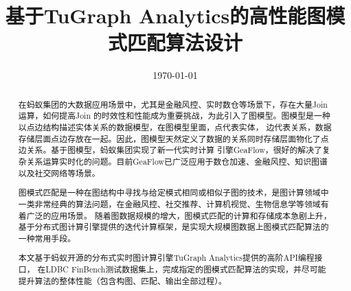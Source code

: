 

\title{基于TuGraph Analytics的⾼性能图模式匹配算法设计}
\date{\today}





\maketitle

\begin{abstract}
在蚂蚁集团的大数据应用场景中，尤其是金融风控、实时数仓等场景下，存在大量Join运算，如何提高Join
的时效性和性能成为重要挑战，为此引入了图模型。图模型是一种以点边结构描述实体关系的数据模型，在图模型里面，点代表实体，
边代表关系，数据存储层面点边存放在一起。因此，图模型天然定义了数据的关系同时存储层面物化了点边关系。基于图模型，蚂蚁集团实现了新一代实时计算 引擎GeaFlow，很好的解决了复杂关系运算实时化的问题。目前GeaFlow已广泛应用于数仓加速、金融风控、知识图谱以及社交网络等场景。

图模式匹配是一种在图结构中寻找与给定模式相同或相似子图的技术，是图计算领域中一类非常经典的算法问题，在金融风控、社交推荐、计算机视觉、生物信息学等领域有着广泛的应用场景。
随着图数据规模的增大，图模式匹配的计算和存储成本急剧上升，基于分布式图计算引擎提供的迭代计算框架，是实现大规模图数据上图模式匹配算法的一种常用手段。

本文基于蚂蚁开源的分布式实时图计算引擎TuGraph Analytics提供的⾼阶API编程接口，
在LDBC FinBench测试数据集上，完成指定的图模式匹配算法的实现，并尽可能提升算法的整体性能（包含构图、匹配、输出全部过程）。
\end{abstract}

\newpage

\tableofcontents











